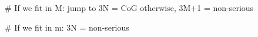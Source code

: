 # If we fit in M: 
jump to 3N = CoG
otherwise, 3M+1 = non-serious

# If we fit in m:
3N = non-serious